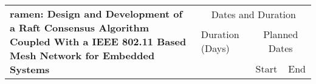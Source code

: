 \documentclass[compsoc]{IEEEtran}
\begin{document}
\begin{table}[ht]
    \scriptsize
    
    \renewcommand{\arraystretch}{1.125}
    
    
    \newcommand{\setCurrDate}[3]{\setdatenumber{#1}{#2}{#3}}
    
    \def\datedate{\thedatemonth/\thedateday/\thedateyear}
    
    \newcommand{\TEdate}[1]{
        \setdatebynumber{\thedatenumber}
        \multicolumn{1}{c}{#1} & 
        \datedate & 
        \addtocounter{datenumber}{#1} \setdatebynumber{\thedatenumber}
        \datedate
    }
    
    \setcounter{SubTableEntryID}{0}
    \setcounter{TableEntryID}{0}
    \newcommand\showTE{\setcounter{SubTableEntryID}{0}\stepcounter{TableEntryID}\theTableEntryID.\theSubTableEntryID \ }
    \newcommand\showSubTE{\stepcounter{SubTableEntryID}\theTableEntryID.\theSubTableEntryID \ }
    
    \newcommand{\tableEntry}[1]{\hline \multirow{2}{*}{\showTE #1}}
    \newcommand{\subTableEntry}[2]{& \showSubTE #1 & \TEdate{#2} \\ \cline{2-5}}
    \newcommand{\initialTableEntry}[2]{&0.1 #1 & \TEdate{#2} \\ \cline{2-5}}
    \newcommand{\finalTableEntry}[2]{\hline &\showTE #1 & \TEdate{#2} \\ \hline}

    \label{tab:work_breakdown_structure}
    
    \begin{center}
        \begin{tabular}{|l|p{30em}|p{3.5em}|r|r|}
            \hline
            \multicolumn{2}{|l|}{\multirow{3}{9cm}{\textbf{ramen: Design and Development of a Raft Consensus Algorithm Coupled With a IEEE 802.11 Based Mesh Network for Embedded Systems}}} & \multicolumn{3}{c|}{Dates and Duration} \\ \cline{3-5}
            \multicolumn{2}{|l|}{ } & Duration (Days) & \multicolumn{2}{c|}{Planned Dates} \\ \cline{3-5}
            \multicolumn{2}{|l|}{ } & & \multicolumn{1}{c}{Start} & \multicolumn{1}{|c|}{End} \\ \hline
            

\end{tabular}
\end{center}
\end{table}
\end{document}

